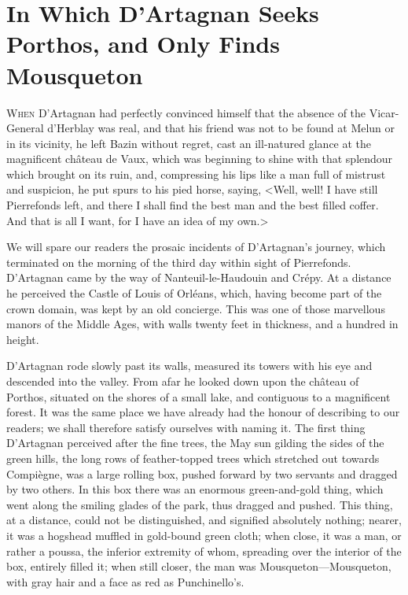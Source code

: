 \chapter{In Which D'Artagnan Seeks Porthos, and Only Finds Mousqueton}

\lettrine{W}{hen} D'Artagnan had perfectly convinced himself that the absence of the Vicar-General d'Herblay was real, and that his friend was not to be found at Melun or in its vicinity, he left Bazin without regret, cast an ill-natured glance at the magnificent château de Vaux, which was beginning to shine with that splendour which brought on its ruin, and, compressing his lips like a man full of mistrust and suspicion, he put spurs to his pied horse, saying, <Well, well! I have still Pierrefonds left, and there I shall find the best man and the best filled coffer. And that is all I want, for I have an idea of my own.>

We will spare our readers the prosaic incidents of D'Artagnan's journey, which terminated on the morning of the third day within sight of Pierrefonds. D'Artagnan came by the way of Nanteuil-le-Haudouin and Crépy. At a distance he perceived the Castle of Louis of Orléans, which, having become part of the crown domain, was kept by an old concierge. This was one of those marvellous manors of the Middle Ages, with walls twenty feet in thickness, and a hundred in height.

D'Artagnan rode slowly past its walls, measured its towers with his eye and descended into the valley. From afar he looked down upon the château of Porthos, situated on the shores of a small lake, and contiguous to a magnificent forest. It was the same place we have already had the honour of describing to our readers; we shall therefore satisfy ourselves with naming it. The first thing D'Artagnan perceived after the fine trees, the May sun gilding the sides of the green hills, the long rows of feather-topped trees which stretched out towards Compiègne, was a large rolling box, pushed forward by two servants and dragged by two others. In this box there was an enormous green-and-gold thing, which went along the smiling glades of the park, thus dragged and pushed. This thing, at a distance, could not be distinguished, and signified absolutely nothing; nearer, it was a hogshead muffled in gold-bound green cloth; when close, it was a man, or rather a poussa, the inferior extremity of whom, spreading over the interior of the box, entirely filled it; when still closer, the man was Mousqueton—Mousqueton, with gray hair and a face as red as Punchinello's.

